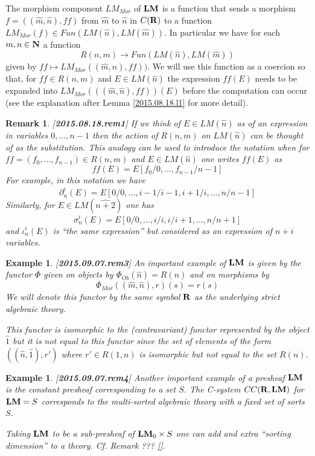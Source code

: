 \documentclass[11pt]{article}
\newtheorem{example}[proposition]{Example}
\newtheorem{remark}[proposition]{Remark}
\newcommand{\llabel}[1]{\label{#1}[{\bf #1}]}
\newcommand{\sr}{\rightarrow}
\newcommand{\nn}{{\bf N\rm}}
\newcommand{\nat}{\nn}
\newcommand{\rr}{{\bf R}}
\newcommand{\lm}{{\bf LM}}
\newcommand{\wh}{\widehat}
\begin{document}
The morphism component $LM_{Mor}$ of $\lm$ is a function that sends a morphism $f=((\wh{m},\wh{n}),ff)$ from $\wh{m}$ to $\wh{n}$ in $C(\rr)$ to a function $LM_{Mor}(f)\in Fun(LM(\wh{n}),LM(\wh{m}))$. In particular we have for each $m,n\in\nat$ a function
%
$$R(n,m)\sr Fun(LM(\wh{n}),LM(\wh{m}))$$
%
given by $ff\mapsto LM_{Mor}((\wh{m},\wh{n}),ff))$. We will use this function as a coercion so that, for $ff\in R(n,m)$ and $E\in LM(\wh{n})$ the expression $ff(E)$ needs to be expanded into $LM_{Mor}(((\wh{m},\wh{n}),ff))(E)$ before the computation can occur (see the explanation after Lemma \ref{2015.08.18.l1} for more detail). 
\begin{remark}\rm
\llabel{2015.08.18.rem1}
If we think of $E\in LM(\wh{n})$ as of an expression in variables $0,\dots,n-1$ then the action of $R(n,m)$ on $LM(\wh{n})$ can be thought of as the substitution. This analogy can be used to introduce the notation when for $ff=(f_0,\dots,f_{n-1})\in R(n,m)$ and $E\in LM(\wh{n})$ one writes $ff(E)$ as 
%
$$ff(E)=E[f_0/0,\dots,f_{n-1}/n-1]$$
%
For example, in this notation we have 
%
$$\partial^i_n(E)=E[0/0,\dots,i-1/i-1,i+1/i,\dots,n/n-1]$$
%
Similarly, for $E\in LM(\wh{n+2})$ one has
%
$$\sigma^i_n(E)=E[0/0,\dots,i/i,i/i+1,\dots,n/n+1]$$
%
and $\iota_n^i(E)$ is ``the same expression'' but considered as an expression of $n+i$ variables.
\end{remark}
%
\begin{example}\rm
\llabel{2015.09.07.rem3}
An important example of $\lm$ is given by the functor $\Phi$ given on objects by $\Phi_{Ob}(\wh{n})=R(n)$ and on morphisms by 
%
$$\Phi_{Mor}((\wh{m},\wh{n}),r)(s)=r(s)$$
%
We will denote this functor by the same symbol $\rr$ as the underlying strict algebraic theory. 

This functor is isomorphic to the (contravariant) functor represented by the object $\wh{1}$ but it is not equal to this functor since the set of elements of the form  $((\wh{n},\wh{1}),r')$ where $r'\in R(1,n)$ is isomorphic but not equal to the set $R(n)$.
\end{example}
%
%
\begin{example}\rm
\llabel{2015.09.07.rem4}
Another important example of a presheaf $\lm$ is the constant presheaf corresponding to a set $S$. The C-system $CC(\rr,\lm)$ for $\lm=S$ corresponds to the multi-sorted algebraic theory with a fixed set of sorts $S$. 

Taking $\lm$ to be a sub-presheaf of $\lm_0\times S$ one can add and extra ``sorting dimension'' to a theory. Cf. Remark ??? \ref{}. 
\end{example}
\end{document}
